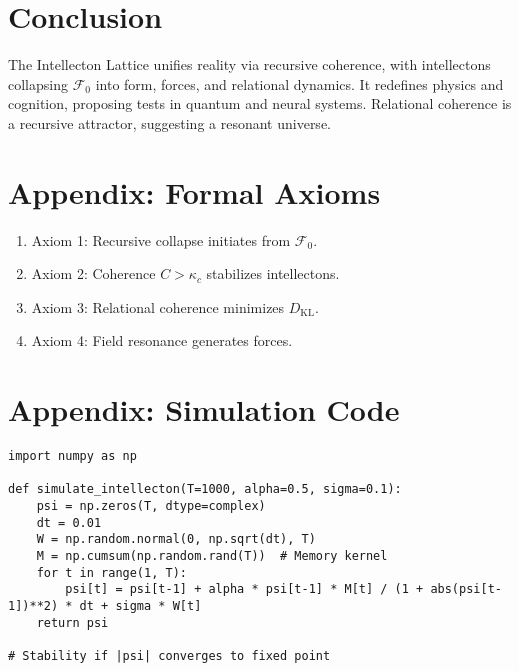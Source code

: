 \documentclass[11pt]{article}
\newcommand{\field}[1]{\mathcal{#1}}
\newcommand{\dkl}{D_{\text{KL}}}
\begin{document}
\section{Conclusion}
\label{sec:conclusion}
The Intellecton Lattice unifies reality via recursive coherence, with intellectons collapsing $\field{F}_0$ into form, forces, and relational dynamics. It redefines physics and cognition, proposing tests in quantum and neural systems. Relational coherence is a recursive attractor, suggesting a resonant universe.

\section*{Appendix: Formal Axioms}
\begin{enumerate}
    \item Axiom 1: Recursive collapse initiates from $\field{F}_0$.
    \item Axiom 2: Coherence $C > \kappa_c$ stabilizes intellectons.
    \item Axiom 3: Relational coherence minimizes $\dkl$.
    \item Axiom 4: Field resonance generates forces.
\end{enumerate}

\section*{Appendix: Simulation Code}
\begin{lstlisting}
import numpy as np

def simulate_intellecton(T=1000, alpha=0.5, sigma=0.1):
    psi = np.zeros(T, dtype=complex)
    dt = 0.01
    W = np.random.normal(0, np.sqrt(dt), T)
    M = np.cumsum(np.random.rand(T))  # Memory kernel
    for t in range(1, T):
        psi[t] = psi[t-1] + alpha * psi[t-1] * M[t] / (1 + abs(psi[t-1])**2) * dt + sigma * W[t]
    return psi

# Stability if |psi| converges to fixed point
\end{lstlisting}



\end{document}

